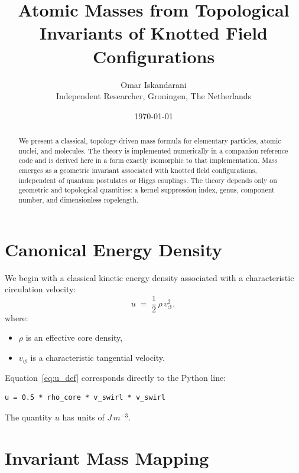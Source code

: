 \documentclass[11pt,a4paper]{article}
\title{\textbf{Atomic Masses from Topological Invariants of Knotted Field Configurations}}
\author{Omar Iskandarani\\
Independent Researcher, Groningen, The Netherlands}
\date{\today}
\begin{document}
    \maketitle

    \begin{abstract}
        We present a classical, topology-driven mass formula for elementary particles,
        atomic nuclei, and molecules.
        The theory is implemented numerically in a companion reference code and is
        derived here in a form exactly isomorphic to that implementation.
        Mass emerges as a geometric invariant associated with knotted field
        configurations, independent of quantum postulates or Higgs couplings.
        The theory depends only on geometric and topological quantities: a kernel
        suppression index, genus, component number, and dimensionless ropelength.
    \end{abstract}

    \section{Canonical Energy Density}

        We begin with a classical kinetic energy density associated with a
        characteristic circulation velocity:
        \begin{equation}
            u \;=\; \frac{1}{2}\,\rho\,v_{\circlearrowleft}^2 ,
            \label{eq:u_def}
        \end{equation}
        where:
        \begin{itemize}
            \item $\rho$ is an effective core density,
            \item $v_{\circlearrowleft}$ is a characteristic tangential velocity.
        \end{itemize}

        Equation~\eqref{eq:u_def} corresponds directly to the Python line:
        \begin{verbatim}
u = 0.5 * rho_core * v_swirl * v_swirl
        \end{verbatim}

        The quantity $u$ has units of $\si{J\,m^{-3}}$.

    \section{Invariant Mass Mapping}
\end{document}
